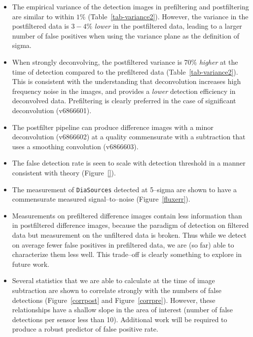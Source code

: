 \documentclass[prd, nofootinbib, floatfix, 11pt,tightenlines,times]{article}
\begin{document}
\begin{itemize}
\item The empirical variance of the detection images in prefiltering
  and postfiltering are similar to within $1\%$
  (Table~\ref{tab-variance2}).  However, the variance in the
  postfiltered data is $3-4\%$ {\it lower} in the postfiltered data,
  leading to a larger number of false positives when using the
  variance plane as the definition of sigma.

\item When strongly deconvolving, the postfiltered variance is 70\%
  {\it higher} at the time of detection compared to the prefiltered
  data (Table~\ref{tab-variance2}).  This is consistent with the
  understanding that deconvolution increases high frequency noise in
  the images, and provides a {\it lower} detection efficiency in
  deconvolved data.  Prefiltering is clearly preferred in the case of
  significant deconvolution (v6866601).

\item The postfilter pipeline can produce difference images with a
  minor deconvolution (v6866602) at a quality commensurate with a subtraction that uses a
  smoothing convolution (v6866603).

\item The false detection rate is seen to scale with detection
  threshold in a manner consistent with theory (Figure~\ref{}).

\item The measurement of {\tt DiaSources} detected at 5--sigma are
  shown to have a commensurate measured signal--to--noise
  (Figure~\ref{fluxerr}).  

\item Measurements on prefiltered difference images contain less
  information than in postfiltered difference images, because the
  paradigm of detection on filtered data but measurement on the
  unfiltered data is broken.  Thus while we detect on average fewer
  false positives in prefiltered data, we are (so far) able to
  characterize them less well.  This trade--off is clearly something
  to explore in future work.

\item Several statistics that we are able to calculate at the time of
  image subtraction are shown to correlate strongly with the numbers
  of false detections (Figure~\ref{corrpost} and
  Figure~\ref{corrpre}).  However, these relationships have a shallow
  slope in the area of interest (number of false detections per sensor
  less than 10).  Additional work will be required to produce a robust
  predictor of false positive rate.


\end{itemize}
\end{document}
